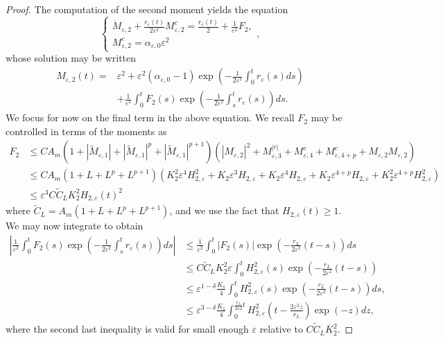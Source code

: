 \documentclass[]{article}
\theoremstyle{remark}
\begin{document}
\begin{proof}
 The computation of the second moment yields the equation 
\[\begin{cases}
    \dot{M}_{\varepsilon,2}+\frac{r_\varepsilon(t)}{2\varepsilon^2}M^{c}_{\varepsilon,2}=\frac{r_\varepsilon(t)}{2}+\frac{1}{\varepsilon^2}
F_2,\\
M_{\varepsilon,2}^{c}=\alpha_{\varepsilon,0}\varepsilon^2\end{cases},\]
whose solution may be written
\begin{align}\label{eqn:Meps2}
    M_{\varepsilon,2}(t)=&\varepsilon^2+\varepsilon^2(\alpha_{\varepsilon,0}-1)\exp\left(-\frac{1}{2\varepsilon^2}\int_{0}^{t}r_\varepsilon(s)ds\right)\nonumber\\
    &+\frac{1}{\varepsilon^2}\int_{0}^{t}F_2(s)\exp\left(-\frac{1}{2\varepsilon^2}\int_{s}^{t}r_\varepsilon(s)\right)ds.
\end{align}
We focus for now on the final term in the above equation. We recall $F_2$ may be controlled in terms of the moments as
\begin{align*}
  F_2&\leq{}CA_m(1+|\widetilde{M}_{\varepsilon,1}|+|\widetilde{M}_{\varepsilon,1}|^p+|\widetilde{M}_{\varepsilon,1}|^{p+1})(|M_{\varepsilon,2}|^2+M_{\varepsilon,3}^{|c|}+M_{\varepsilon,4}^{c}+M_{\varepsilon,4+p}^{c}+M_{\varepsilon,2}M_{\varepsilon,2})\\
  &\leq{}CA_m(1+L+L^p+L^{p+1})(K_2^2\varepsilon^4H_{2,\varepsilon}^2+K_2\varepsilon^3H_{2,\varepsilon}+K_2\varepsilon^4H_{2,\varepsilon}+K_2\varepsilon^{4+p}H_{2,\varepsilon}+K_2^2\varepsilon^{4+p}H_{2,\varepsilon}^2)\\
  &\leq{}\varepsilon^3C\tilde{C}_LK_2^2H_{2,\varepsilon}(t)^2
\end{align*}
where $\tilde{C}_L=A_m(1+L+L^p+L^{p+1})$, and we use the fact that $H_{2,\varepsilon}(t)\geq{}1$. We may now integrate to obtain
\begin{align*}
    \left\vert\frac{1}{\varepsilon^2}\int_{0}^{t}F_2(s)\exp\left(-\frac{1}{2\varepsilon^2}\int_{s}^{t}r_\varepsilon(s)\right)ds\right\vert&\leq{}    \frac{1}{\varepsilon^2}\int_{0}^{t}|F_2(s)|\exp\left(-\frac{r_L}{2\varepsilon^2}(t-s)\right)ds\\ &\leq{}C\tilde{C}_LK_2^2\varepsilon\int_{0}^{t}H_{2,\varepsilon}^2(s)\exp\left(-\frac{r_L}{2\varepsilon^2}(t-s)\right)\\
    &\leq{}\varepsilon^{1-\delta}\frac{K_1}{4}\int_{0}^t{}H_{2,\varepsilon}^2(s)\exp\left(-\frac{r_L}{2\varepsilon^2}(t-s)\right)ds,\\
    &\leq{}\varepsilon^{3-\delta}\frac{K_1}{4}\int_{0}^{\frac{r_L}{2\varepsilon 2}t}H_{2,\varepsilon}^2\left(t-\frac{2\varepsilon^2{z}}{r_L}\right)\exp\left(-z\right)dz,
\end{align*}
where the second last inequality is valid for small enough $\varepsilon$ relative to $C\tilde{C}_LK_2^2$.


\end{proof}
\end{document}

